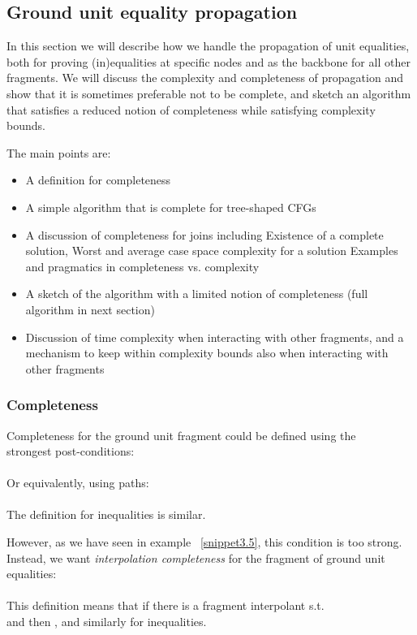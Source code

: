 \newpage
\subsection{Ground unit equality propagation}
In this section we will describe how we handle the propagation of unit equalities, 
both for proving (in)equalities at specific nodes and as the backbone for all other fragments.
We will discuss the complexity and completeness of propagation and show that it is sometimes preferable not to be complete,
and sketch an algorithm that satisfies a reduced notion of completeness while satisfying complexity bounds.

The main points are:
\begin{itemize}
	\item A definition for completeness
	\item A simple algorithm that is complete for tree-shaped CFGs
	\item A discussion of completeness for joins including
		\subitem Existence of a complete solution, 
		\subitem Worst and average case space complexity for a solution
		\subitem Examples and pragmatics in completeness vs. complexity
	\item A sketch of the algorithm with a limited notion of completeness (full algorithm in next section)
	\item Discussion of time complexity when interacting with other fragments, 
	and a mechanism to keep within complexity bounds also when interacting with other fragments
\end{itemize}

\subsubsection*{Completeness}
Completeness for the ground unit fragment could be defined using the \\
strongest post-conditions:\\
 \\
Or equivalently, using paths:\\
 \\
The definition for inequalities is similar.

However, as we have seen in example ~\ref{snippet3.5}, this condition is too strong.
Instead, we want \emph{interpolation completeness} for the fragment of ground unit equalities:\\
\\
This definition means that if there is a fragment interpolant  s.t.  \\
and  then , and similarly for inequalities.


